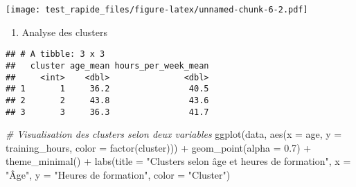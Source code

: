\documentclass[
]{article}
\newenvironment{Shaded}{\begin{snugshade}}{\end{snugshade}}
\newcommand{\AttributeTok}[1]{\textcolor[rgb]{0.77,0.63,0.00}{#1}}
\newcommand{\CommentTok}[1]{\textcolor[rgb]{0.56,0.35,0.01}{\textit{#1}}}
\newcommand{\ConstantTok}[1]{\textcolor[rgb]{0.00,0.00,0.00}{#1}}
\newcommand{\FloatTok}[1]{\textcolor[rgb]{0.00,0.00,0.81}{#1}}
\newcommand{\FunctionTok}[1]{\textcolor[rgb]{0.00,0.00,0.00}{#1}}
\newcommand{\NormalTok}[1]{#1}
\newcommand{\OtherTok}[1]{\textcolor[rgb]{0.56,0.35,0.01}{#1}}
\newcommand{\SpecialCharTok}[1]{\textcolor[rgb]{0.00,0.00,0.00}{#1}}
\newcommand{\StringTok}[1]{\textcolor[rgb]{0.31,0.60,0.02}{#1}}
\providecommand{\tightlist}{%
  \setlength{\itemsep}{0pt}\setlength{\parskip}{0pt}}
\begin{document}
\texttt{[image: test\_rapide\_files/figure-latex/unnamed-chunk-6-2.pdf]}

\begin{enumerate}
\def\labelenumi{\arabic{enumi}.}
\setcounter{enumi}{4}
\tightlist
\item
  Analyse des clusters
\end{enumerate}

\begin{Shaded}
\end{Shaded}

\begin{verbatim}
## # A tibble: 3 x 3
##   cluster age_mean hours_per_week_mean
##     <int>    <dbl>               <dbl>
## 1       1     36.2                40.5
## 2       2     43.8                43.6
## 3       3     36.3                41.7
\end{verbatim}

\begin{Shaded}
\begin{Highlighting}[]
\CommentTok{\# Visualisation des clusters selon deux variables}
\FunctionTok{ggplot}\NormalTok{(data, }\FunctionTok{aes}\NormalTok{(}\AttributeTok{x =}\NormalTok{ age, }\AttributeTok{y =}\NormalTok{ training\_hours, }\AttributeTok{color =} \FunctionTok{factor}\NormalTok{(cluster))) }\SpecialCharTok{+}
  \FunctionTok{geom\_point}\NormalTok{(}\AttributeTok{alpha =} \FloatTok{0.7}\NormalTok{) }\SpecialCharTok{+}
  \FunctionTok{theme\_minimal}\NormalTok{() }\SpecialCharTok{+}
  \FunctionTok{labs}\NormalTok{(}\AttributeTok{title =} \StringTok{"Clusters selon âge et heures de formation"}\NormalTok{, }\AttributeTok{x =} \StringTok{"Âge"}\NormalTok{, }\AttributeTok{y =} \StringTok{"Heures de formation"}\NormalTok{, }\AttributeTok{color =} \StringTok{"Cluster"}\NormalTok{)}
\end{Highlighting}
\end{Shaded}
\end{document}
